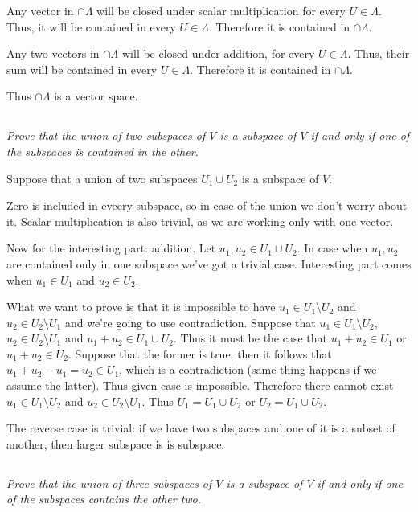 \documentclass[11pt,oneside,titlepage]{book}
\begin{document}
Any vector in $\cap \Lambda$ will be closed under scalar multiplication
for every $U \in \Lambda$. Thus, it will be contained in every
$U \in \Lambda$. Therefore it is contained in $\cap \Lambda$.


Any two  vectors in $\cap \Lambda$ will be closed under addition,
for every $U \in \Lambda$. Thus, their sum  will be contained in every
$U \in \Lambda$. Therefore it is contained in $\cap \Lambda$.

Thus $\cap \Lambda$ is a vector space.

\subsection{}
\textit{Prove that the union of two subspaces of $V$ is a subspace of $V$
  if and only if one of the subspaces is contained in the other.}

Suppose that a union of two subspaces $U_1 \cup U_2$
is a subspace of $V$.

Zero is included in eveery subspace, so in case of the union we don't worry
about it.
Scalar multiplication is also trivial, as we are working only with one vector.

Now for the interesting part: addition. Let $u_1, u_2 \in U_1 \cup U_2$.
In case when $u_1, u_2$ are contained only in one subspace we've got
a trivial case. Interesting part comes when $u_1 \in U_1$ and $u_2 \in U_2$.

What we want to prove is that it is impossible to have
$u_1 \in U_1 \setminus U_2$ and $u_2 \in U_2 \setminus U_1$ and we're going to
use contradiction. Suppose that
$u_1 \in U_1 \setminus U_2$, $u_2 \in U_2 \setminus U_1$ and
$u_1 + u_2 \in U_1 \cup U_2$. Thus it must be the case that
$u_1 + u_2 \in U_1$ or $u_1 + u_2 \in U_2$. Suppose that the former is true;
then it follows that $u_1 + u_2 - u_1 = u_2 \in U_1$, which is a contradiction
(same thing happens if we assume the latter). Thus given case is impossible.
Therefore there cannot exist $u_1 \in U_1 \setminus U_2$ and
$u_2 \in U_2 \setminus U_1$. Thus
$U_1 = U_1 \cup U_2$ or $U_2 = U_1 \cup U_2$.

The reverse case is trivial: if we have two subspaces and
one of it is a subset of another, then larger subspace is is subspace.

\subsection{}
\textit{Prove that the union of three subspaces of $V$ is a subspace of
  $V$ if and only if one of the subspaces contains the other two.}
\end{document}
